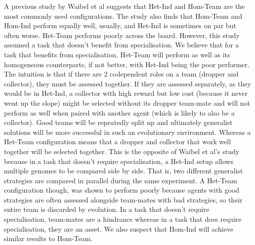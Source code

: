 \documentclass[12pt]{article}
\begin{document}
A previous study by Waibel et al suggests that Het-Ind and Hom-Team are the most commonly used configurations.
The study also finds that Hom-Team and Hom-Ind perform equally well, usually, and Het-Ind is sometimes on par but often worse. 
Het-Team performs poorly across the board.
However, this study assumed a task that doesn’t benefit from specialisation. 
We believe that for a task that benefits from specialisation, Het-Team will perform as well as its homogeneous counterparts, if not better, with Het-Ind being the poor performer.
The intuition is that if there are 2 codependent roles on a team (dropper and collector), they must be assessed together. 
If they are assessed separately, as they would be in Het-Ind, a collector with high reward but low cost (because it never went up the slope) might be selected without its dropper team-mate and will not perform as well when paired with another agent (which is likely to also be a collector).
Good teams will be repeatedly split up and ultimately generalist solutions will be more successful in such an evolutionary environment.
Whereas a Het-Team configuration means that a dropper and collector that work well together will be selected together.
This is the opposite of Waibel et al's study because in a task that doesn't require specialisation, a Het-Ind setup allows multiple genomes to be compared side by side.
That is, two different generalist strategies are compared in parallel during the same experiment.
A Het-Team configuration though, was shown to perform poorly because agents with good strategies are often assessed alongside team-mates with bad strategies, so their entire team is discarded by evolution.
In a task that doesn't require specialisation, team-mates are a hindrance whereas in a task that does require specialisation, they are an asset.
We also suspect that Hom-Ind will achieve similar results to Hom-Team.



\end{document}

